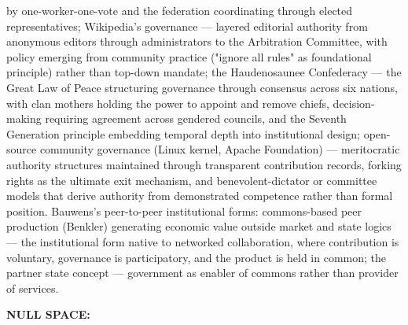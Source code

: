 by one-worker-one-vote and the federation coordinating through elected representatives; Wikipedia's governance — layered editorial authority from anonymous editors through administrators to the Arbitration Committee, with policy emerging from community practice ("ignore all rules" as foundational principle) rather than top-down mandate; the Haudenosaunee Confederacy — the Great Law of Peace structuring governance through consensus across six nations, with clan mothers holding the power to appoint and remove chiefs, decision-making requiring agreement across gendered councils, and the Seventh Generation principle embedding temporal depth into institutional design; open-source community governance (Linux kernel, Apache Foundation) — meritocratic authority structures maintained through transparent contribution records, forking rights as the ultimate exit mechanism, and benevolent-dictator or committee models that derive authority from demonstrated competence rather than formal position. Bauwens's peer-to-peer institutional forms: commons-based peer production (Benkler) generating economic value outside market and state logics — the institutional form native to networked collaboration, where contribution is voluntary, governance is participatory, and the product is held in common; the partner state concept — government as enabler of commons rather than provider of services.


\textbf{NULL SPACE:}

